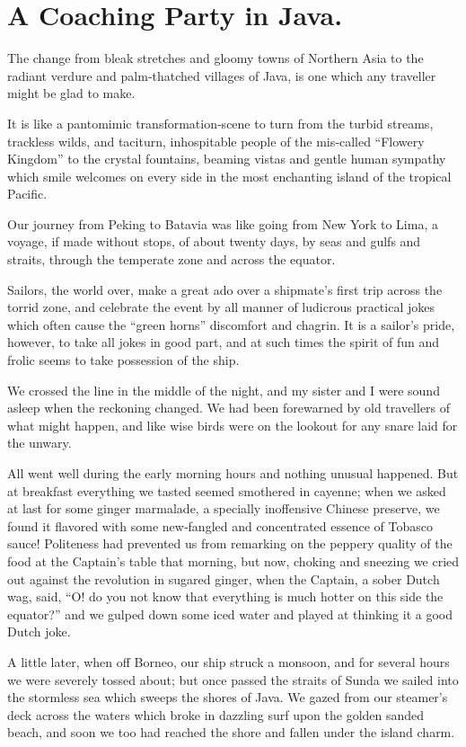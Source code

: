 \documentclass[12pt]{book}
\begin{document}
\chapter{A Coaching Party in Java.}

The change from bleak stretches and gloomy towns of Northern Asia to the radiant
verdure and palm‐thatched villages of Java, is one which any traveller might be
glad to make.

It is like a pantomimic transformation‐scene to turn from the turbid streams,
trackless wilds, and taciturn, inhospitable people of the mis‐called “Flowery
Kingdom” to the crystal fountains, beaming vistas and gentle human sympathy
which smile welcomes on every side in the most enchanting island of the tropical
Pacific.

Our journey from Peking to Batavia was like going from New York to Lima, a
voyage, if made without stops, of about twenty days, by seas and gulfs and straits,
through the temperate zone and across the equator.

Sailors, the world over, make a great ado over a shipmate’s first trip across
the torrid zone, and celebrate the event by all manner of ludicrous practical jokes
which often cause the “green horns” discomfort and chagrin. It is a sailor’s pride,
however, to take all jokes in good part, and at such times the spirit of fun and
frolic seems to take possession of the ship.

We crossed the line in the middle of the night, and my sister and I were sound
asleep when the reckoning changed. We had been forewarned by old travellers
of what might happen, and like wise birds were on the lookout for any snare laid
for the unwary.

All went well during the early morning hours and nothing unusual happened.
But at breakfast everything we tasted seemed smothered in cayenne; when we
asked at last for some ginger marmalade, a specially inoffensive Chinese preserve,
we found it flavored with some new‐fangled and concentrated essence of Tobasco
sauce! Politeness had prevented us from remarking on the peppery quality of the
food at the Captain’s table that morning, but now, choking and sneezing we cried
out against the revolution in sugared ginger, when the Captain, a sober Dutch
wag, said, “O! do you not know that everything is much hotter on this side the
equator?” and we gulped down some iced water and played at thinking it a good
Dutch joke.

A little later, when off Borneo, our ship struck a monsoon, and for several
hours we were severely tossed about; but once passed the straits of Sunda we
sailed into the stormless sea which sweeps the shores of Java. We gazed from our
steamer’s deck across the waters which broke in dazzling surf upon the golden
sanded beach, and soon we too had reached the shore and fallen under the island
charm.
\end{document}
